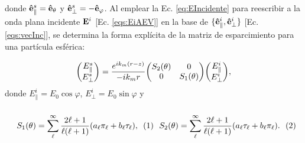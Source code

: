 donde $\vu{e}_\parallel^s =\vu{e}_\theta$ y $\vu{e}_\perp^s=-\vu{e}_\varphi$. Al emplear la Ec. \eqref{eq:EIncidente} para reescribir a la onda plana incidente $\vb{E}^i$ [Ec. \eqref{eqs:EiAEV}] en la base de $\{\vu{e}_\parallel^i,\vu{e}_\perp^i\}$ [Ec. \eqref{eqs:vecInc}], se determina la forma explícita de la matriz de esparcimiento para una partícula esférica:\vspace*{-.75em} 
	\begin{tcolorbox}[title = Matriz de esparcimiento de Mie,  breakable ]
	\begin{align}
	\mqty(E_{\parallel}^s\\E_{\perp}^s)  =  
		\frac{e^{ik_m(r-z)}}{-ik_mr} \mqty(S_2 (\theta) & 0\\ 0 & S_1 (\theta))
	\mqty(E_{\parallel}^i\\E_{\perp}^i),	
	\label{eq:MieMatrix}
	\end{align}
	donde $E^i_\parallel=E_0\cos\varphi$, $E^i_\perp = E_0\sin\varphi$ y \begin{subequations}\\
	\eqhalf{	S_1 (\theta) = \sum_\ell^\infty\frac{2\ell+1}{\ell(\ell+1)}(a_\ell\pi_\ell+b_\ell\tau_\ell),
				\label{eqs:S_1}}
	\eqhalf{	S_2 (\theta) = \sum_\ell^\infty\frac{2\ell+1}{\ell(\ell+1)}( a_\ell \tau_\ell + b_\ell\pi_\ell ).
			 \label{eqs:S_2}	}
	\label{eq:MatrixElements}	\end{subequations}
	\end{tcolorbox}\vspace*{-.75em}\noindent

